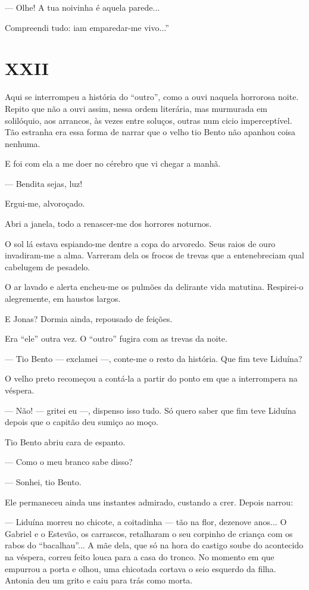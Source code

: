 --- Olhe! A tua noivinha é aquela parede...

Compreendi tudo: iam emparedar-me vivo...''

\section{XXII}

Aqui se interrompeu a história do ``outro'', como a ouvi naquela
horrorosa noite. Repito que não a ouvi assim, nessa ordem literária, mas
murmurada em solilóquio, aos arrancos, às vezes entre soluços, outras
num cicio imperceptível. Tão estranha era essa forma de narrar que o
velho tio Bento não apanhou coisa nenhuma.

E foi com ela a me doer no cérebro que vi chegar a manhã.

--- Bendita sejas, luz!

Ergui-me, alvoroçado.

Abri a janela, todo a renascer-me dos horrores noturnos.

O sol lá estava espiando-me dentre a copa do arvoredo. Seus raios de
ouro invadiram-me a alma. Varreram dela os frocos de trevas que a
entenebreciam qual cabelugem de pesadelo.

O ar lavado e alerta encheu-me os pulmões da delirante vida matutina.
Respirei-o alegremente, em haustos largos.

E Jonas? Dormia ainda, repousado de feições.

Era ``ele'' outra vez. O ``outro'' fugira com as trevas da noite.

--- Tio Bento --- exclamei ---, conte-me o resto da história. Que fim
teve Liduína?

O velho preto recomeçou a contá-la a partir do ponto em que a
interrompera na véspera.

--- Não! --- gritei eu ---, dispenso isso tudo. Só quero saber que fim
teve Liduína depois que o capitão deu sumiço ao moço.

Tio Bento abriu cara de espanto.

--- Como o meu branco sabe disso?

--- Sonhei, tio Bento.

Ele permaneceu ainda uns instantes admirado, custando a crer. Depois
narrou:

--- Liduína morreu no chicote, a coitadinha --- tão na flor, dezenove
anos... O Gabriel e o Estevão, os carrascos, retalharam o seu corpinho
de criança com os rabos do ``bacalhau''... A mãe dela, que só na hora do
castigo soube do acontecido na véspera, correu feito louca para a casa
do tronco. No momento em que empurrou a porta e olhou, uma chicotada
cortava o seio esquerdo da filha. Antonia deu um grito e caiu para trás
como morta.

